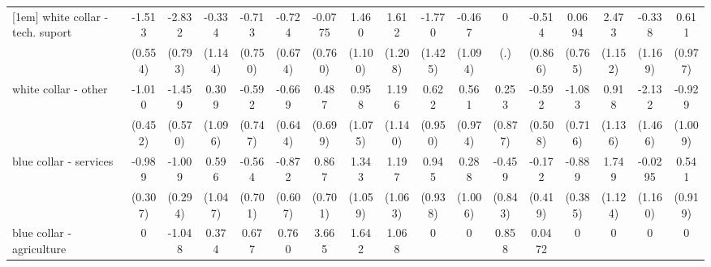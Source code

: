 {\begin{tabular}{l*{16}{c}}
[1em]
white collar - tech. suport&      -1.513\sym{**} &      -2.832\sym{***}&      -0.334         &      -0.713         &      -0.724         &     -0.0775         &       1.460         &       1.612         &      -1.770         &      -0.467         &           0         &      -0.514         &      0.0694         &       2.473\sym{*}  &      -0.338         &       0.611         \\
                    &     (0.554)         &     (0.793)         &     (1.144)         &     (0.750)         &     (0.674)         &     (0.760)         &     (1.100)         &     (1.208)         &     (1.425)         &     (1.094)         &         (.)         &     (0.866)         &     (0.765)         &     (1.152)         &     (1.169)         &     (0.977)         \\
[1em]
white collar - other&      -1.010\sym{*}  &      -1.459\sym{*}  &       0.309         &      -0.592         &      -0.669         &       0.487         &       0.958         &       1.196         &       0.622         &       0.561         &       0.253         &      -0.592         &      -1.083         &       0.918         &      -2.132         &      -0.929         \\
                    &     (0.452)         &     (0.570)         &     (1.096)         &     (0.747)         &     (0.644)         &     (0.699)         &     (1.075)         &     (1.140)         &     (0.950)         &     (0.974)         &     (0.877)         &     (0.508)         &     (0.716)         &     (1.136)         &     (1.466)         &     (1.009)         \\
[1em]
blue collar - services&      -0.989\sym{**} &      -1.009\sym{***}&       0.596         &      -0.564         &      -0.872         &       0.867         &       1.343         &       1.197         &       0.945         &       0.288         &      -0.459         &      -0.172         &      -0.889\sym{*}  &       1.749         &     -0.0295         &       0.541         \\
                    &     (0.307)         &     (0.294)         &     (1.047)         &     (0.701)         &     (0.607)         &     (0.701)         &     (1.059)         &     (1.063)         &     (0.938)         &     (1.006)         &     (0.843)         &     (0.419)         &     (0.385)         &     (1.124)         &     (1.160)         &     (0.919)         \\
[1em]
blue collar - agriculture&           0         &      -1.048         &       0.374         &       0.677         &       0.760         &       3.665\sym{**} &       1.642         &       1.068         &           0         &           0         &       0.858         &      0.0472         &           0         &           0         &           0         &           0         \\

\end{tabular}}
